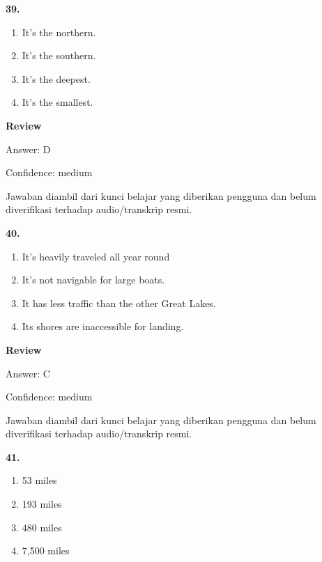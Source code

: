 \documentclass[12pt]{article}
\begin{document}
\noindent\textbf{39.}
\begin{enumerate}[label=(\Alph*),leftmargin=*,itemsep=0.2em]
\item It's the northern.
\item It's the southern.
\item It's the deepest.
\item It's the smallest.
\end{enumerate}
\par
\begingroup
\setlength{\parskip}{0pt}
\setlength{\parindent}{0pt}
\textbf{Review}\par
Answer: D\par
Confidence: medium\par
Jawaban diambil dari kunci belajar yang diberikan pengguna dan belum diverifikasi terhadap audio/transkrip resmi.\par
\endgroup
\par
\vspace{0.25\baselineskip}
\noindent\textbf{40.}
\begin{enumerate}[label=(\Alph*),leftmargin=*,itemsep=0.2em]
\item It's heavily traveled all year round
\item It's not navigable for large boats.
\item It has less traffic than the other Great Lakes.
\item Its shores are inaccessible for landing.
\end{enumerate}
\par
\begingroup
\setlength{\parskip}{0pt}
\setlength{\parindent}{0pt}
\textbf{Review}\par
Answer: C\par
Confidence: medium\par
Jawaban diambil dari kunci belajar yang diberikan pengguna dan belum diverifikasi terhadap audio/transkrip resmi.\par
\endgroup
\par
\vspace{0.25\baselineskip}
\noindent\textbf{41.}
\begin{enumerate}[label=(\Alph*),leftmargin=*,itemsep=0.2em]
\item 53 miles
\item 193 miles
\item 480 miles
\item 7,500 miles
\end{enumerate}
\par
\begingroup
\setlength{\parskip}{0pt}
\setlength{\parindent}{0pt}
\end{document}

